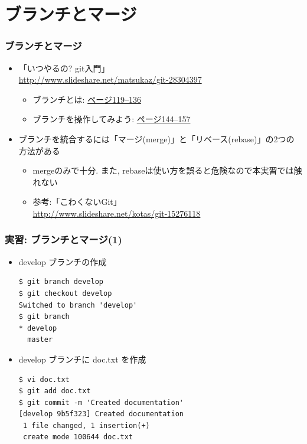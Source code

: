 \section{ブランチとマージ}

\begin{frame}
  \frametitle{ブランチとマージ}
  \begin{itemize}
    \setlength{\itemsep}{1em}
  \item 「いつやるの? git入門」\\ {\footnotesize \url{http://www.slideshare.net/matsukaz/git-28304397}}
    \begin{itemize}
    \item ブランチとは: \href{http://www.slideshare.net/matsukaz/git-28304397/119}{ページ119--136}      
    \item ブランチを操作してみよう: \href{http://www.slideshare.net/matsukaz/git-28304397/144}{ページ144--157}
    \end{itemize}
  \item ブランチを統合するには「マージ(merge)」と「リベース(rebase)」の2つの方法がある
    \begin{itemize}
    \item mergeのみで十分. また, rebaseは使い方を誤ると危険なので本実習では触れない \\
    \item 参考:「こわくないGit」\\
      \url{http://www.slideshare.net/kotas/git-15276118}
    \end{itemize}
  \end{itemize}
\end{frame}

\begin{frame}[t,fragile]
  \frametitle{実習: ブランチとマージ(1)}
  \begin{itemize}
  \item develop ブランチの作成
\begin{lstlisting}
$ git branch develop
$ git checkout develop
Switched to branch 'develop'
$ git branch
* develop
  master
\end{lstlisting}
  \item develop ブランチに doc.txt を作成
\begin{lstlisting}
$ vi doc.txt
$ git add doc.txt
$ git commit -m 'Created documentation'
[develop 9b5f323] Created documentation
 1 file changed, 1 insertion(+)
 create mode 100644 doc.txt
\end{lstlisting}
  \end{itemize}
\end{frame}

